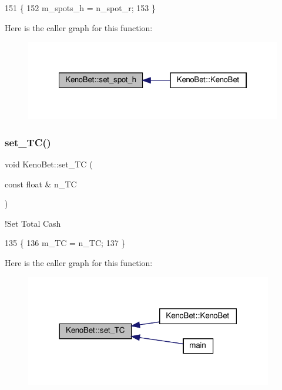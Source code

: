 \begin{DoxyCode}
151 \{
152     m\_spots\_h = n\_spot\_r; 
153 \}
\end{DoxyCode}
Here is the caller graph for this function\+:
\nopagebreak
\begin{figure}[H]
\begin{center}
\leavevmode
\includegraphics[width=322pt]{classKenoBet_acdeff501accf00661e0151901bc888c0_icgraph}
\end{center}
\end{figure}
\mbox{\label{classKenoBet_aa9be1ef95a09fcc293e7c73e763ff176}} 
\subsubsection{\texorpdfstring{set\+\_\+\+T\+C()}{set\_TC()}}
{\footnotesize\ttfamily void Keno\+Bet\+::set\+\_\+\+TC (\begin{DoxyParamCaption}\item[{const float \&}]{n\+\_\+\+TC }\end{DoxyParamCaption})}



!\+Set Total Cash 


\begin{DoxyCode}
135 \{
136     m\_TC = n\_TC;
137 \}
\end{DoxyCode}
Here is the caller graph for this function\+:
\nopagebreak
\begin{figure}[H]
\begin{center}
\leavevmode
\includegraphics[width=306pt]{classKenoBet_aa9be1ef95a09fcc293e7c73e763ff176_icgraph}
\end{center}
\end{figure}
\mbox{\label{classKenoBet_abd6b6b0b0ed9c3d030a71673dc89f39a}} 

